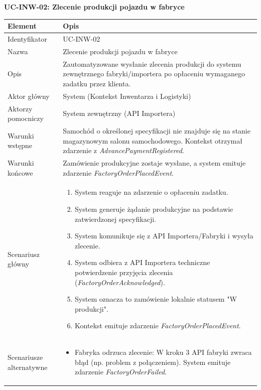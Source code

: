 \textbf{UC-INW-02: Zlecenie produkcji pojazdu w fabryce}

\begin{longtable}{|p{4cm}|p{11cm}|}
\hline
\textbf{Element} & \textbf{Opis} \\
\hline

Identyfikator & UC-INW-02 \\
\hline

Nazwa & Zlecenie produkcji pojazdu w fabryce \\
\hline

Opis & 
Zautomatyzowane wysłanie zlecenia produkcji do systemu zewnętrznego fabryki/importera po opłaceniu wymaganego zadatku przez klienta. \\
\hline

Aktor główny & System (Kontekst Inwentarza i Logistyki) \\
\hline

Aktorzy pomocniczy & System zewnętrzny (API Importera) \\
\hline

Warunki wstępne & 
Samochód o określonej specyfikacji nie znajduje się na stanie magazynowym salonu samochodowego. Kontekst otrzymał zdarzenie z \textit{AdvancePaymentRegistered}. \\
\hline

Warunki końcowe & 
Zamówienie produkcyjne zostaje wysłane, a system emituje zdarzenie \textit{FactoryOrderPlacedEvent}. \\
\hline

Scenariusz główny & 
\begin{enumerate}
\item System reaguje na zdarzenie o opłaceniu zadatku.
    \item System generuje żądanie produkcyjne na podstawie zatwierdzonej specyfikacji.
    \item System komunikuje się z API Importera/Fabryki i wysyła zlecenie.
    \item System odbiera z API Importera techniczne potwierdzenie przyjęcia zlecenia (\textit{FactoryOrderAcknowledged}).
    \item System oznacza to zamówienie lokalnie statusem "W produkcji".
    \item Kontekst emituje zdarzenie \textit{FactoryOrderPlacedEvent}.
\end{enumerate} \\
\hline

Scenariusze alternatywne & 
\begin{itemize}
    \item [A1] Fabryka odrzuca zlecenie: W kroku 3 API fabryki zwraca błąd (np. problem z połączeniem). System emituje zdarzenie \textit{FactoryOrderFailed}.
\end{itemize} \\
\hline
\end{longtable}

